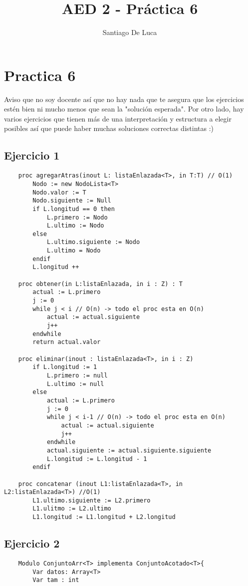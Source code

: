 \documentclass[10pt,a4paper]{article}
\begin{document}
\title{AED 2 - Práctica 6}
\author{Santiago De Luca}

\maketitle

\section{Practica 6}
Aviso que no soy docente así que no hay nada que te asegura que los ejercicios estén bien ni mucho menos que sean la "solución esperada".
Por otro lado, hay varios ejercicios que tienen más de una interpretación y estructura a elegir posibles así que puede haber muchas soluciones correctas distintas :)
\subsection{Ejercicio 1}


\begin{lstlisting}
	proc agregarAtras(inout L: listaEnlazada<T>, in T:T) // O(1)
		Nodo := new NodoLista<T>
		Nodo.valor := T
		Nodo.siguiente := Null
		if L.longitud == 0 then
			L.primero := Nodo
			L.ultimo := Nodo
		else 
			L.ultimo.siguiente := Nodo
			L.ultimo = Nodo
		endif
		L.longitud ++

	proc obtener(in L:listaEnlazada, in i : Z) : T
		actual := L.primero
		j := 0
		while j < i // O(n) -> todo el proc esta en O(n)
			actual := actual.siguiente
			j++
		endwhile
		return actual.valor

	proc eliminar(inout : listaEnlazada<T>, in i : Z)
		if L.longitud := 1
			L.primero := null
			L.ultimo := null
		else
			actual := L.primero
			j := 0
			while j < i-1 // O(n) -> todo el proc esta en O(n)
				actual := actual.siguiente
				j++
			endwhile
			actual.siguiente := actual.siguiente.siguiente
			L.longitud := L.longitud - 1
		endif

	proc concatenar (inout L1:listaEnlazada<T>, in L2:listaEnlazada<T>) //O(1)
		L1.ultimo.siguiente := L2.primero
		L1.ulitmo := L2.ultimo
		L1.longitud := L1.longitud + L2.longitud
\end{lstlisting}
 
\pagebreak

\subsection{Ejercicio 2}

\begin{lstlisting}
	Modulo ConjuntoArr<T> implementa ConjuntoAcotado<T>{
		Var datos: Array<T>
		Var tam : int
		
\end{lstlisting}
\end{document}
